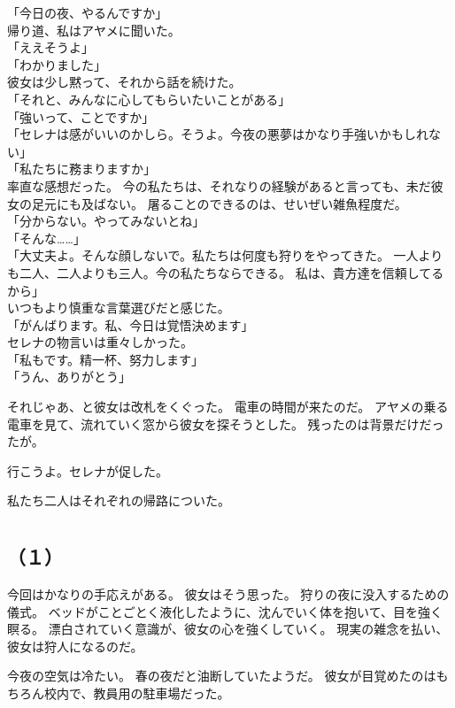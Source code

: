 \documentclass[../IHMain]{subfiles}
\begin{document}
「今日の夜、やるんですか」\\
帰り道、私はアヤメに聞いた。\\
「ええそうよ」\\
「わかりました」\\
彼女は少し黙って、それから話を続けた。\\
「それと、みんなに心してもらいたいことがある」\\
「強いって、ことですか」\\
「セレナは感がいいのかしら。そうよ。今夜の悪夢はかなり手強いかもしれない」\\
「私たちに務まりますか」\\
率直な感想だった。
今の私たちは、それなりの経験があると言っても、未だ彼女の足元にも及ばない。
屠ることのできるのは、せいぜい雑魚程度だ。\\
「分からない。やってみないとね」\\
「そんな……」\\
「大丈夫よ。そんな顔しないで。私たちは何度も狩りをやってきた。
一人よりも二人、二人よりも三人。今の私たちならできる。
私は、貴方達を信頼してるから」\\
いつもより慎重な言葉選びだと感じた。\\
「がんばります。私、今日は覚悟決めます」\\
セレナの物言いは重々しかった。\\
「私もです。精一杯、努力します」\\
「うん、ありがとう」

それじゃあ、と彼女は改札をくぐった。
電車の時間が来たのだ。
アヤメの乗る電車を見て、流れていく窓から彼女を探そうとした。
残ったのは背景だけだったが。

行こうよ。セレナが促した。

私たち二人はそれぞれの帰路についた。

\section{}
\subsection*{（１）}
今回はかなりの手応えがある。
彼女はそう思った。
狩りの夜に没入するための儀式。
ベッドがことごとく液化したように、沈んでいく体を抱いて、目を強く瞑る。
漂白されていく意識が、彼女の心を強くしていく。
現実の雑念を払い、彼女は狩人になるのだ。

今夜の空気は冷たい。
春の夜だと油断していたようだ。
彼女が目覚めたのはもちろん校内で、教員用の駐車場だった。
\end{document}
